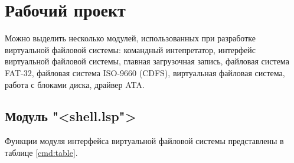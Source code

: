 \section{Рабочий проект}

Можно выделить несколько модулей, использованных при разработке
виртуальной файловой системы: командный интепретатор, интерфейс виртуальной файловой системы, главная загрузочная запись, файловая система FAT-32, файловая система ISO-9660 (CDFS), виртуальная файловая система, работа с блоками диска, драйвер ATA.

\subsection{Модуль "<shell.lsp">}

Функции модуля интерфейса виртуальной файловой системы представлены в таблице \ref{cmd:table}.

